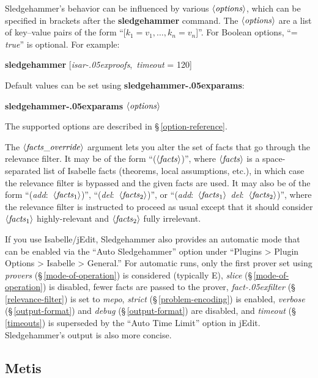 \documentclass[a4paper,12pt]{article}
\let\oldS=\S
\def\S{\oldS\,}
\def\qty#1{\ensuremath{\left<\mathit{#1\/}\right>}}
\renewcommand\_{\hbox{\textunderscore\kern-.05ex}}
\begin{document}
Sledgehammer's behavior can be influenced by various \qty{options}, which can be
specified in brackets after the \textbf{sledgehammer} command. The
\qty{options} are a list of key--value pairs of the form ``[$k_1 = v_1,
\ldots, k_n = v_n$]''. For Boolean options, ``= \textit{true\/}'' is optional.
For example:

\prew
\textbf{sledgehammer} [\textit{isar\_proofs}, \,\textit{timeout} = 120]
\postw

Default values can be set using \textbf{sledgehammer\_\allowbreak params}:

\prew
\textbf{sledgehammer\_params} \qty{options}
\postw

The supported options are described in \S\ref{option-reference}.

The \qty{facts\_override} argument lets you alter the set of facts that go
through the relevance filter. It may be of the form ``(\qty{facts})'', where
\qty{facts} is a space-separated list of Isabelle facts (theorems, local
assumptions, etc.), in which case the relevance filter is bypassed and the given
facts are used. It may also be of the form ``(\textit{add}:\ \qty{facts\/_{\mathrm{1}}})'',
``(\textit{del}:\ \qty{facts\/_{\mathrm{2}}})'', or ``(\textit{add}:\ \qty{facts\/_{\mathrm{1}}}\
\textit{del}:\ \qty{facts\/_{\mathrm{2}}})'', where the relevance filter is instructed to
proceed as usual except that it should consider \qty{facts\/_{\mathrm{1}}}
highly-relevant and \qty{facts\/_{\mathrm{2}}} fully irrelevant.

If you use Isabelle/jEdit, Sledgehammer also provides an automatic mode that can
be enabled via the ``Auto Sledgehammer'' option under ``Plugins > Plugin Options
> Isabelle > General.'' For automatic runs, only the first prover set using
\textit{provers} (\S\ref{mode-of-operation}) is considered (typically E),
\textit{slice} (\S\ref{mode-of-operation}) is disabled,
fewer facts are
passed to the prover, \textit{fact\_filter} (\S\ref{relevance-filter}) is set to
\textit{mepo}, \textit{strict} (\S\ref{problem-encoding}) is enabled,
\textit{verbose} (\S\ref{output-format}) and \textit{debug}
(\S\ref{output-format}) are disabled, and \textit{timeout} (\S\ref{timeouts}) is
superseded by the ``Auto Time Limit'' option in jEdit. Sledgehammer's output is
also more concise.


\subsection{Metis}
\label{metis}
\end{document}
